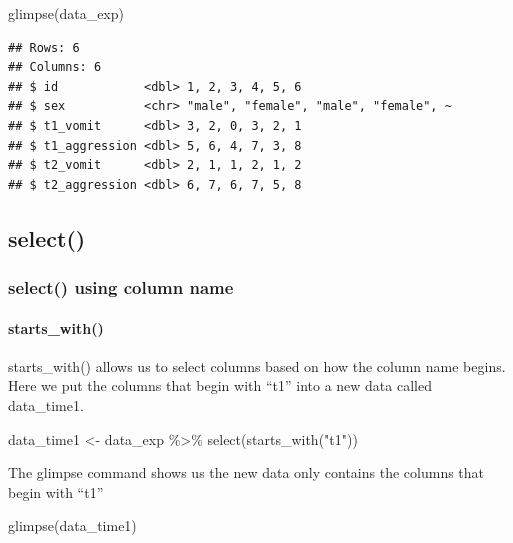 \documentclass[
]{krantz}
\makeatletter
\newenvironment{Shaded}{\begin{snugshade}}{\end{snugshade}}
\newcommand{\FunctionTok}[1]{\textcolor[rgb]{0,0,0}{#1}}
\newcommand{\NormalTok}[1]{#1}
\newcommand{\OtherTok}[1]{\textcolor[rgb]{0.37,0.37,0.37}{#1}}
\newcommand{\SpecialCharTok}[1]{\textcolor[rgb]{0,0,0}{#1}}
\newcommand{\StringTok}[1]{\textcolor[rgb]{0.5,0.5,0.5}{#1}}
\newenvironment{kframe}{%
\medskip{}
\setlength{\fboxsep}{.8em}
 \def\at@end@of@kframe{}%
 \ifinner\ifhmode%
  \def\at@end@of@kframe{\end{minipage}}%
  \begin{minipage}{\columnwidth}%
 \fi\fi%
 \def\FrameCommand##1{\hskip\@totalleftmargin \hskip-\fboxsep
 \colorbox{shadecolor}{##1}\hskip-\fboxsep
     \hskip-\linewidth \hskip-\@totalleftmargin \hskip\columnwidth}%
 \MakeFramed {\advance\hsize-\width
   \@totalleftmargin\z@ \linewidth\hsize
   \@setminipage}}%
 {\par\unskip\endMakeFramed%
 \at@end@of@kframe}
\renewenvironment{Shaded}{\begin{kframe}}{\end{kframe}}
\makeatother
\begin{document}
\begin{Shaded}
\begin{Highlighting}[]
\FunctionTok{glimpse}\NormalTok{(data\_exp)}
\end{Highlighting}
\end{Shaded}

\begin{verbatim}
## Rows: 6
## Columns: 6
## $ id            <dbl> 1, 2, 3, 4, 5, 6
## $ sex           <chr> "male", "female", "male", "female", ~
## $ t1_vomit      <dbl> 3, 2, 0, 3, 2, 1
## $ t1_aggression <dbl> 5, 6, 4, 7, 3, 8
## $ t2_vomit      <dbl> 2, 1, 1, 2, 1, 2
## $ t2_aggression <dbl> 6, 7, 6, 7, 5, 8
\end{verbatim}

\hypertarget{select-1}{%
\subsection{select()}\label{select-1}}

\hypertarget{select-using-column-name}{%
\subsubsection{select() using column name}\label{select-using-column-name}}

\hypertarget{starts_with}{%
\paragraph{starts\_with()}\label{starts_with}}

starts\_with() allows us to select columns based on how the column name begins. Here we put the columns that begin with ``t1'' into a new data called data\_time1.

\begin{Shaded}
\begin{Highlighting}[]
\NormalTok{data\_time1 }\OtherTok{\textless{}{-}}\NormalTok{ data\_exp }\SpecialCharTok{\%\textgreater{}\%} 
  \FunctionTok{select}\NormalTok{(}\FunctionTok{starts\_with}\NormalTok{(}\StringTok{"t1"}\NormalTok{))}
\end{Highlighting}
\end{Shaded}

The glimpse command shows us the new data only contains the columns that begin with ``t1''

\begin{Shaded}
\begin{Highlighting}[]
\FunctionTok{glimpse}\NormalTok{(data\_time1)}
\end{Highlighting}
\end{Shaded}
\end{document}
